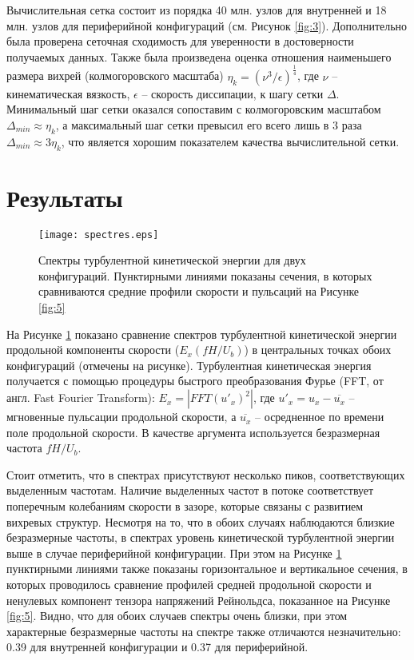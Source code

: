 Вычислительная сетка состоит из порядка 40 млн. узлов для внутренней 
и 18 млн. узлов для периферийной конфигураций (см. Рисунок \ref{fig:3}).
%
Дополнительно была проверена сеточная сходимость для уверенности в достоверности получаемых данных.
%
Также была произведена оценка отношения наименьшего размера вихрей (колмогоровского масштаба)  
$\eta_k = (\nu^3/\epsilon)^\frac{1}{4}$, где $\nu$ -- кинематическая вязкость, 
$\epsilon$ -- скорость диссипации, к шагу сетки $\Delta$.
%
Минимальный шаг сетки оказался сопоставим с колмогоровским масштабом 
$\Delta_{min} \approx \eta_k$, а максимальный шаг сетки превысил его всего лишь в 3 раза 
$\Delta_{min} \approx 3\eta_k$, что является хорошим показателем качества вычислительной сетки.


\section{Результаты}\label{ch4:results}

\begin{figure}[h!]
  \centering
  \texttt{[image: spectres.eps]}
  \caption{Спектры турбулентной кинетической энергии для двух конфигураций. 
  Пунктирными линиями показаны сечения, в которых сравниваются средние профили 
  скорости и пульсаций на Рисунке \ref{fig:5}}
  \label{fig:4}
\end{figure}


На Рисунке \ref{fig:4} показано сравнение спектров турбулентной кинетической энергии 
продольной компоненты скорости ($E_x(fH/U_b)$) в центральных точках обоих конфигураций (отмечены на рисунке). 
%
Турбулентная кинетическая энергия получается с помощью процедуры 
быстрого преобразования Фурье (FFT, от англ. Fast Fourier Transform): 
$E_x = |FFT(u'_x)^2|$, где $u'_x = u_x - \overline{u_x}$ -- мгновенные пульсации продольной скорости, 
а $\overline{u_x}$ -- осредненное по времени поле продольной скорости. 
%
В качестве аргумента используется безразмерная частота $fH/U_b$.

%
Стоит отметить, что в спектрах присутствуют несколько пиков, соответствующих выделенным частотам. 
%
Наличие выделенных частот в потоке соответствует поперечным колебаниям скорости в зазоре, 
которые связаны с развитием вихревых структур. 
%
Несмотря на то, что в обоих случаях наблюдаются близкие безразмерные частоты, 
в спектрах уровень кинетической турбулентной энергии выше в случае периферийной конфигурации.
%
При этом на Рисунке \ref{fig:4} пунктирными линиями также показаны горизонтальное и вертикальное сечения, 
в которых проводилось сравнение профилей средней продольной скорости и ненулевых компонент тензора 
напряжений Рейнольдса, показанное на Рисунке \ref{fig:5}.
%
Видно, что для обоих случаев спектры очень близки, при этом характерные безразмерные частоты на спектре также 
отличаются незначительно: 0.39 для внутренней конфигурации и 0.37 для периферийной. 
%


